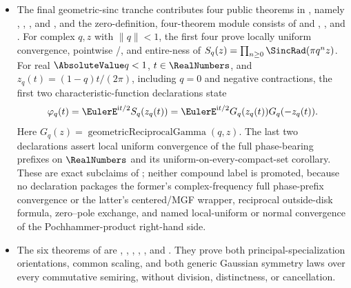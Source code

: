 \documentclass[11pt,a4paper,oneside,openany]{book}
\theoremstyle{definition}
\theoremstyle{remark}
\begin{document}
\begin{itemize}
\item The final geometric-sinc tranche contributes four public theorems in
, namely
,
,
, and
, and the zero-definition,
four-theorem module  consists of
and
,
, and
.
For complex $q,z$ with $\lVert q\rVert<1$, the first four prove locally
uniform convergence, pointwise /, and
entire-ness of
$S_q(z)=\prod_{n\ge0}\SincRad(\pi q^nz)$.  For real
$\AbsoluteValue q<1$, $t\in\RealNumbers$, and $z_q(t)=(1-q)t/(2\pi)$, including $q=0$ and
negative contractions, the first two characteristic-function declarations state
\[
 \varphi_q(t)=\EulerE^{\mathrm i t/2}S_q(z_q(t))
 =\EulerE^{\mathrm i t/2}G_q(z_q(t))G_q(-z_q(t)).
\]
Here $G_q(z)=\operatorname{geometricReciprocalGamma}(q,z)$.
The last two declarations assert local uniform convergence of the full
phase-bearing prefixes on \(\RealNumbers\) and its uniform-on-every-compact-set
corollary.
These are exact subclaims of
; neither compound
label is promoted, because no declaration packages the former's
complex-frequency full phase-prefix convergence or the latter's centered/MGF
wrapper, reciprocal outside-disk formula, zero--pole exchange, and named
local-uniform or normal convergence of the Pochhammer-product right-hand side.

\item The six theorems of  are
,
,
,
,
, and
.  They prove both
principal-specialization orientations, common scaling, and both generic
Gaussian symmetry laws over every commutative semiring, without division,
distinctness, or cancellation.


\end{itemize}
\end{document}
